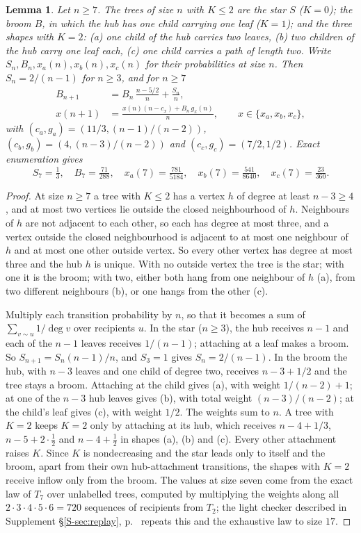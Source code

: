 \documentclass[11pt]{article}
\newtheorem{lemma}{Lemma}[section]
\theoremstyle{remark}
\newcommand{\Sref}[1]{Supplement \S\ref{S-#1}, p.~\pageref{S-#1}}
\begin{document}
\begin{lemma}\label{lem:nearstar}
Let $n\ge7$. The trees of size $n$ with $K\le2$ are the star $S$ ($K=0$); the broom $B$, in which the hub has one child carrying one leaf ($K=1$); and the three shapes with $K=2$: (a) one child of the hub carries two leaves, (b) two children of the hub carry one leaf each, (c) one child carries a path of length two. Write $S_n,B_n,x_a(n),x_b(n),x_c(n)$ for their probabilities at size $n$. Then $S_n=2/(n-1)$ for $n\ge3$, and for $n\ge7$
\begin{align*}
 B_{n+1}&=B_n\,\frac{n-5/2}{n}+\frac{S_n}{n},\\
 x(n+1)&=\frac{x(n)(n-c_x)+B_n\,g_x(n)}{n},\qquad x\in\{x_a,x_b,x_c\},
\end{align*}
with $(c_a,g_a)=(11/3,(n-1)/(n-2))$, $(c_b,g_b)=(4,(n-3)/(n-2))$ and $(c_c,g_c)=(7/2,1/2)$. Exact enumeration gives
\[
 S_7=\tfrac13,\quad B_7=\tfrac{71}{288},\quad x_a(7)=\tfrac{781}{5184},\quad x_b(7)=\tfrac{541}{8640},\quad x_c(7)=\tfrac{23}{360}.
\]
\end{lemma}
\begin{proof}
At size $n\ge7$ a tree with $K\le2$ has a vertex $h$ of degree at least $n-3\ge4$, and at most two vertices lie outside the closed neighbourhood of $h$. Neighbours of $h$ are not adjacent to each other, so each has degree at most three, and a vertex outside the closed neighbourhood is adjacent to at most one neighbour of $h$ and at most one other outside vertex. So every other vertex has degree at most three and the hub $h$ is unique. With no outside vertex the tree is the star; with one it is the broom; with two, either both hang from one neighbour of $h$ (a), from two different neighbours (b), or one hangs from the other (c).

Multiply each transition probability by $n$, so that it becomes a sum of $\sum_{v\sim u}1/\deg v$ over recipients $u$. In the star ($n\ge3$), the hub receives $n-1$ and each of the $n-1$ leaves receives $1/(n-1)$; attaching at a leaf makes a broom. So $S_{n+1}=S_n(n-1)/n$, and $S_3=1$ gives $S_n=2/(n-1)$. In the broom the hub, with $n-3$ leaves and one child of degree two, receives $n-3+1/2$ and the tree stays a broom. Attaching at the child gives (a), with weight $1/(n-2)+1$; at one of the $n-3$ hub leaves gives (b), with total weight $(n-3)/(n-2)$; at the child's leaf gives (c), with weight $1/2$. The weights sum to $n$. A tree with $K=2$ keeps $K=2$ only by attaching at its hub, which receives $n-4+1/3$, $n-5+2\cdot\frac12$ and $n-4+\frac12$ in shapes (a), (b) and (c). Every other attachment raises $K$. Since $K$ is nondecreasing and the star leads only to itself and the broom, apart from their own hub-attachment transitions, the shapes with $K=2$ receive inflow only from the broom. The values at size seven come from the exact law of $T_7$ over unlabelled trees, computed by multiplying the weights along all $2\cdot3\cdot4\cdot5\cdot6=720$ sequences of recipients from $T_2$; the light checker described in \Sref{sec:replay} repeats this and the exhaustive law to size $17$.
\end{proof}
\end{document}
